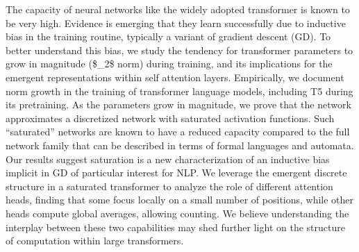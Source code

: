 The capacity of neural networks like the widely adopted transformer is known to be very high. Evidence is emerging that they learn successfully due to inductive bias in the training routine, typically a variant of gradient descent (GD). To better understand this bias, we study the tendency for transformer parameters to grow in magnitude (\$\ell\_2\$ norm) during training, and its implications for the emergent representations within self attention layers. Empirically, we document norm growth in the training of transformer language models, including T5 during its pretraining. As the parameters grow in magnitude, we prove that the network approximates a discretized network with saturated activation functions. Such ``saturated'' networks are known to have a reduced capacity compared to the full network family that can be described in terms of formal languages and automata. Our results suggest saturation is a new characterization of an inductive bias implicit in GD of particular interest for NLP. We leverage the emergent discrete structure in a saturated transformer to analyze the role of different attention heads, finding that some focus locally on a small number of positions, while other heads compute global averages, allowing counting. We believe understanding the interplay between these two capabilities may shed further light on the structure of computation within large transformers.
